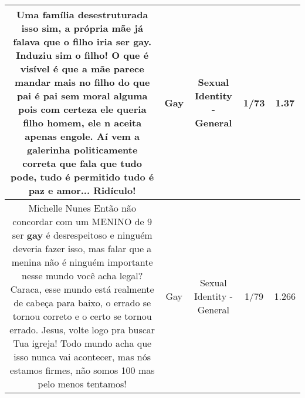 \documentclass[11pt]{article}
\newlength\mylength
\begin{document}
\begin{center}
\begin{longtable}{|C{.65\mylength}|C{.30\mylength}|C{.12\mylength}|C{.12\mylength}|C{.12\mylength}|}
  \small Uma família desestruturada isso sim, a própria mãe já falava que o filho iria ser \textbf{gay}. Induziu sim o filho! O que é visível é que a mãe parece mandar mais no filho do que pai é pai sem moral alguma pois com certeza ele queria filho homem, ele n aceita apenas engole. Aí vem a galerinha politicamente correta que fala que tudo pode, tudo é permitido tudo é paz e amor... Ridículo!\normalsize   & Gay & Sexual Identity - General & 1/73 & 1.37 \\  \hline
  \small Michelle Nunes Então não concordar com um MENINO de 9 ser \textbf{gay} é desrespeitoso e ninguém deveria fazer isso, mas falar que a menina não é ninguém importante nesse mundo você acha legal? Caraca, esse mundo está realmente de cabeça para baixo, o errado se tornou correto e o certo se tornou errado. Jesus, volte logo pra buscar Tua igreja! Todo mundo acha que isso nunca vai acontecer, mas nós estamos firmes, não somos 100 mas pelo menos tentamos!\normalsize   & Gay & Sexual Identity - General & 1/79 & 1.266 \\  \hline

\end{longtable}
\end{center}
\end{document}
